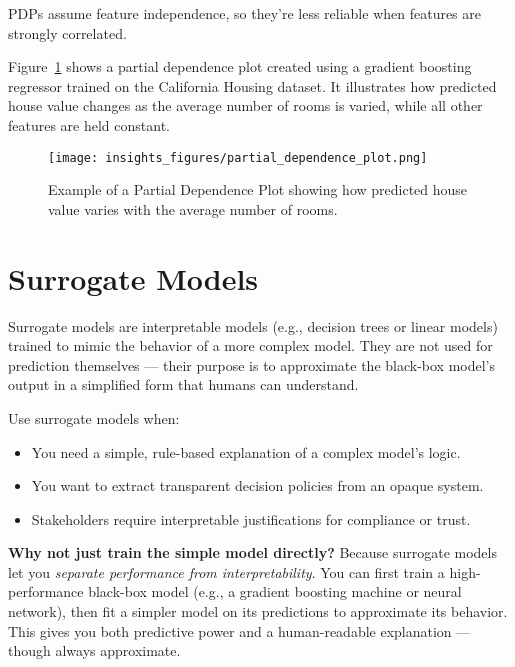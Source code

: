 \documentclass[12pt,openany, draft]{book}
\begin{document}
\begin{notebox}
PDPs assume feature independence, so they're less reliable when features are strongly correlated.
\end{notebox}

Figure~\ref{fig:partial-dependence} shows a partial dependence plot created using a gradient boosting regressor trained on the California Housing dataset. It illustrates how predicted house value changes as the average number of rooms is varied, while all other features are held constant.


\begin{figure}[H]
    \centering
    \texttt{[image: insights\_figures/partial\_dependence\_plot.png]}
    \caption{Example of a Partial Dependence Plot showing how predicted house value varies with the average number of rooms.}
    \label{fig:partial-dependence}
\end{figure}



\section{Surrogate Models}

Surrogate models are interpretable models (e.g., decision trees or linear models) trained to mimic the behavior of a more complex model. They are not used for prediction themselves — their purpose is to approximate the black-box model’s output in a simplified form that humans can understand.

Use surrogate models when:
\begin{itemize}
  \item You need a simple, rule-based explanation of a complex model’s logic.
  \item You want to extract transparent decision policies from an opaque system.
  \item Stakeholders require interpretable justifications for compliance or trust.
\end{itemize}

\textbf{Why not just train the simple model directly?} Because surrogate models let you \textit{separate performance from interpretability}. You can first train a high-performance black-box model (e.g., a gradient boosting machine or neural network), then fit a simpler model on its predictions to approximate its behavior. This gives you both predictive power and a human-readable explanation — though always approximate.
\end{document}
